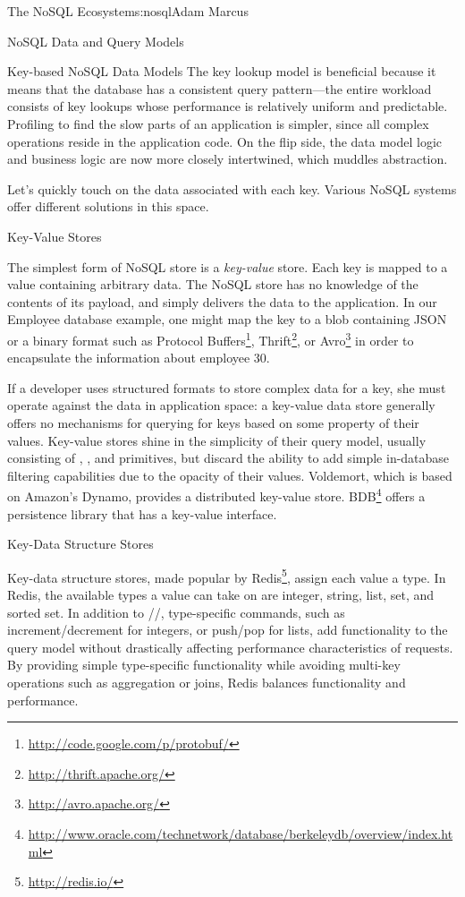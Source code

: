 \begin{aosachapter}{The NoSQL Ecosystem}{s:nosql}{Adam Marcus}
\begin{aosasect1}{NoSQL Data and Query Models}
\begin{aosasect2}{Key-based NoSQL Data Models}
The key lookup model is beneficial because it means that the database
has a consistent query pattern---the entire workload consists of key
lookups whose performance is relatively uniform and predictable.
Profiling to find the slow parts of an application is simpler, since
all complex operations reside in the application code.  On the flip
side, the data model logic and business logic are now more closely
intertwined, which muddles abstraction.

Let's quickly touch on the data associated with each key.  Various
NoSQL systems offer different solutions in this space.

\begin{aosasect3}{Key-Value Stores}

The simplest form of NoSQL store is a \emph{key-value} store.  Each
key is mapped to a value containing arbitrary data.  The NoSQL store
has no knowledge of the contents of its payload, and simply delivers
the data to the application.  In our Employee database example, one
might map the key  to a blob containing JSON or a
binary format such as Protocol
Buffers\footnote{\url{http://code.google.com/p/protobuf/}},
Thrift\footnote{\url{http://thrift.apache.org/}}, or
Avro\footnote{\url{http://avro.apache.org/}} in order to encapsulate
the information about employee 30.

If a developer uses structured formats to store complex data for a
key, she must operate against the data in application space: a
key-value data store generally offers no mechanisms for querying for
keys based on some property of their values.  Key-value stores shine
in the simplicity of their query model, usually consisting of
, , and  primitives, but discard the
ability to add simple in-database filtering capabilities due to the
opacity of their values.  Voldemort, which is based on Amazon's
Dynamo, provides a distributed key-value store.  BDB\footnote{\url{http://www.oracle.com/technetwork/database/berkeleydb/overview/index.html}} offers a
persistence library that has a key-value interface.

\end{aosasect3}

\begin{aosasect3}{Key-Data Structure Stores}

Key-data structure stores, made popular by Redis\footnote{\url{http://redis.io/}}, assign each value a
type.  In Redis, the available types a value can take on are integer,
string, list, set, and sorted set.  In addition to
//, type-specific commands, such as
increment/decrement for integers, or push/pop for lists, add
functionality to the query model without drastically affecting
performance characteristics of requests.  By providing simple
type-specific functionality while avoiding multi-key operations such as
aggregation or joins, Redis balances functionality and performance.


\end{aosasect3}
\end{aosasect2}
\end{aosasect1}
\end{aosachapter}
